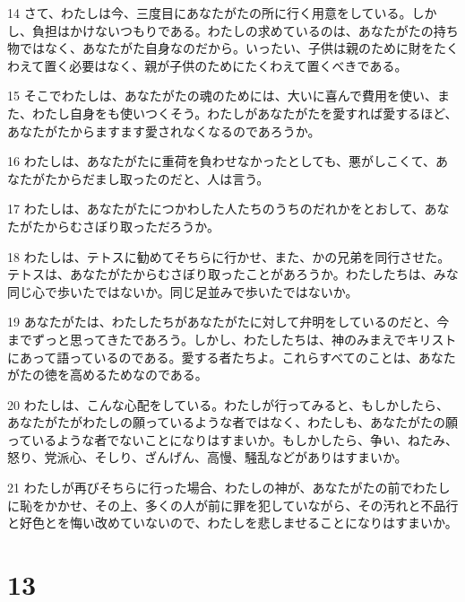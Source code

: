 \par 14 さて、わたしは今、三度目にあなたがたの所に行く用意をしている。しかし、負担はかけないつもりである。わたしの求めているのは、あなたがたの持ち物ではなく、あなたがた自身なのだから。いったい、子供は親のために財をたくわえて置く必要はなく、親が子供のためにたくわえて置くべきである。
\par 15 そこでわたしは、あなたがたの魂のためには、大いに喜んで費用を使い、また、わたし自身をも使いつくそう。わたしがあなたがたを愛すれば愛するほど、あなたがたからますます愛されなくなるのであろうか。
\par 16 わたしは、あなたがたに重荷を負わせなかったとしても、悪がしこくて、あなたがたからだまし取ったのだと、人は言う。
\par 17 わたしは、あなたがたにつかわした人たちのうちのだれかをとおして、あなたがたからむさぼり取っただろうか。
\par 18 わたしは、テトスに勧めてそちらに行かせ、また、かの兄弟を同行させた。テトスは、あなたがたからむさぼり取ったことがあろうか。わたしたちは、みな同じ心で歩いたではないか。同じ足並みで歩いたではないか。
\par 19 あなたがたは、わたしたちがあなたがたに対して弁明をしているのだと、今までずっと思ってきたであろう。しかし、わたしたちは、神のみまえでキリストにあって語っているのである。愛する者たちよ。これらすべてのことは、あなたがたの徳を高めるためなのである。
\par 20 わたしは、こんな心配をしている。わたしが行ってみると、もしかしたら、あなたがたがわたしの願っているような者ではなく、わたしも、あなたがたの願っているような者でないことになりはすまいか。もしかしたら、争い、ねたみ、怒り、党派心、そしり、ざんげん、高慢、騒乱などがありはすまいか。
\par 21 わたしが再びそちらに行った場合、わたしの神が、あなたがたの前でわたしに恥をかかせ、その上、多くの人が前に罪を犯していながら、その汚れと不品行と好色とを悔い改めていないので、わたしを悲しませることになりはすまいか。

\chapter{13}


